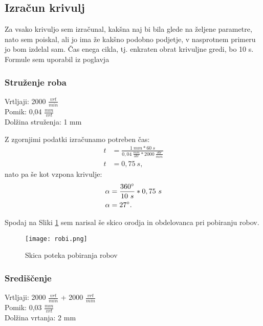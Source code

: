 \subsection{Izračun krivulj}
Za vsako krivuljo sem izračunal, kakšna naj bi bila glede na
željene parametre, nato sem poiskal, ali jo ima že kakšno podobno
podjetje, v nasprotnem primeru jo bom izdelal sam.
Čas enega cikla, tj. enkraten obrat krivuljne gredi, bo 10 s.
Formule sem uporabil iz poglavja 

\subsubsection{Struženje roba}
Vrtljaji: 2000 \( \frac{vrt}{min} \) \\
Pomik: 0,04 \( \frac{mm}{vrt} \) \\
Dolžina struženja: 1 mm

Z zgornjimi podatki izračunamo potreben čas:
\begin{equation*}
	\begin{split}
		t &= \frac{1\ mm*60\ s}{0,04\ \frac{mm}{obr}*2000\ \frac{obr}{min}} \\
		t &= 0,75\ s,
	\end{split}
\end{equation*}
nato pa še kot vzpona krivulje:
\begin{equation*}
	\begin{split}
		\alpha &= \frac{360\degree}{10\ s} * 0,75\ s\\
		\alpha &= 27\degree.
	\end{split}
\end{equation*}

Spodaj na Sliki \ref{shema_robov} sem narisal še skico orodja
in obdelovanca pri pobiranju robov.
\begin{figure}[H]
	\begin{center}
		\texttt{[image: robi.png]}
		\caption{Skica poteka pobiranja robov
			\cite{lasten}}
		\label{shema_robov}
	\end{center}
\end{figure}

\subsubsection{Središčenje}
Vrtljaji: 2000 \( \frac{vrt}{min} \) + 2000 \( \frac{vrt}{min} \)\\
Pomik: 0,03 \( \frac{mm}{vrt} \) \\
Dolžina vrtanja: 2 mm


